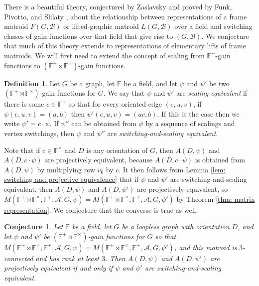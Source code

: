\documentclass[12pt]{article}
\newtheorem{conjecture}[theorem]{Conjecture}
\theoremstyle{definition}
\newtheorem{definition}[theorem]{Definition}
\newcommand{\bF}{\mathbb F}
\newcommand{\cA}{\mathcal{A}}
\newcommand{\cB}{\mathcal{B}}
\begin{document}
There is a beautiful theory, conjectured by Zaslavsky \cite{Zaslavsky2003} and proved by Funk, Pivotto, and Slilaty \cite{Funk-Pivotto-Slilaty-2022}, about the relationship between representations of a frame matroid $F(G, \cB)$ or lifted-graphic matroid $L(G, \cB)$ over a field and switching classes of gain functions over that field that give rise to $(G, \cB)$.
We conjecture that much of this theory extends to representations of elementary lifts of frame matroids.
We will first need to extend the concept of scaling from $\bF^+$-gain functions to $(\bF^+ \rtimes \bF^{\times})$-gain functions.

\begin{definition} \label{def: scaling}
Let $G$ be a graph, let $\bF$ be a field, and let $\psi$ and $\psi'$ be two $(\bF^+ \rtimes \bF^{\times})$-gain functions for $G$.
We say that $\psi$ and $\psi'$ are \emph{scaling equivalent} if there is some $c \in \bF^{\times}$ so that for every oriented edge $(e, u, v)$, if $\psi(e, u, v) = (a, b)$ then $\psi'(e, u, v) = (ac, b)$.
If this is the case then we write $\psi' = c\cdot \psi$.
If $\psi''$ can be obtained from $\psi$ by a sequence of scalings and vertex switchings, then $\psi$ and $\psi''$ are \emph{switching-and-scaling equivalent}.
\end{definition}


Note that if $c \in \bF^{\times}$ and $D$ is any orientation of $G$, then $A(D, \psi)$ and $A(D, c \cdot \psi)$ are projectively equivalent, because $A(D, c \cdot \psi)$ is obtained from $A(D, \psi)$ by multiplying row $v_0$ by $c$.
It then follows from Lemma \ref{lem: switching and projective equivalence} that if $\psi$ and $\psi'$ are switching-and-scaling equivalent, then $A(D, \psi)$ and $A(D, \psi')$ are projectively equivalent, so $M(\bF^{+} \rtimes \bF^{\times}, \bF^+, \cA, G, \psi) = M(\bF^{+} \rtimes \bF^{\times}, \bF^+, \cA, G, \psi')$ by Theorem \ref{thm: matrix representation}.
We conjecture that the converse is true as well.

\begin{conjecture} \label{conj: equivalence for canonical matrices}
Let $\bF$ be a field, let $G$ be a loopless graph with orientation $D$, and let $\psi$ and $\psi'$ be $(\bF^+\rtimes \bF^{\times})$-gain functions for $G$ so that $M(\bF^+ \rtimes \bF^{\times}, \bF^+, \cA, G, \psi) = M(\bF^+ \rtimes \bF^{\times}, \bF^+, \cA, G, \psi')$, and this matroid is $3$-connected and has rank at least $3$.
Then $A(D, \psi)$ and $A(D, \psi')$ are projectively equivalent if and only if $\psi$ and $\psi'$ are switching-and-scaling equivalent. 
\end{conjecture}
\end{document}

